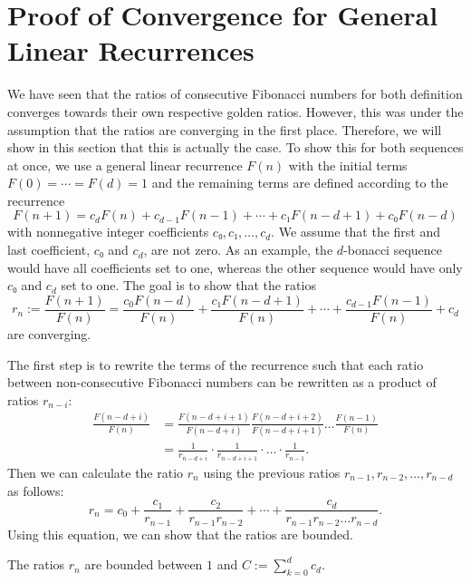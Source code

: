 \section{Proof of Convergence for General Linear Recurrences}
\label{sec:fib-conv}


We have seen that the ratios of consecutive Fibonacci numbers for both
definition converges towards their own respective golden ratios.
However, this was under the assumption that the ratios are converging in the first place.
Therefore, we will show in this section that this is actually the case.
To show this for both sequences at once, we use a general linear recurrence $F(n)$
with the initial terms $F(0) = ⋯ = F(d) = 1$ and the remaining terms are
defined according to the recurrence
\[
  F(n + 1) = c_d F(n) + c_{d-1} F(n-1) + ⋯ + c₁ F(n - d + 1) + c₀ F(n - d)
\]
with nonnegative integer coefficients $c₀, c₁, …, c_d$.
We assume that the first and last coefficient, $c₀$ and $c_d$, are not zero.
As an example, the $d$-bonacci sequence would have all coefficients set to one,
whereas the other sequence would have only $c₀$ and $c_d$ set to one.
The goal is to show that the ratios
\[
  r_n
  := \frac{F(n+1)}{F(n)}
  = \frac{c_0 F(n - d)}{F(n)} + \frac{c₁ F(n - d + 1)}{F(n)} + ⋯ + \frac{c_{d-1} F(n-1)}{F(n)} + c_d
\]
are converging.

The first step is to rewrite the terms of the recurrence such that each ratio
between non-consecutive Fibonacci numbers can be rewritten as a product of
ratios $r_{n-i}$:
\begin{align*}
  \frac{F(n - d + i)}{F(n)}
  & = \frac{F(n - d + i + 1)}{F(n - d + i)} \frac{F(n - d + i + 2)}{F(n - d + i + 1)} \dots \frac{F(n-1)}{F(n)} \\
  & = \frac{1}{r_{n - d + i}} · \frac{1}{r_{n - d + i + 1}} · \dots · \frac{1}{r_{n-1}}.
\end{align*}
Then we can calculate the ratio $r_n$ using the previous ratios $r_{n-1}, r_{n-2}, …, r_{n-d}$ as follows:
\[
  r_n = c_0 + \frac{c_1}{r_{n-1}} + \frac{c_2}{r_{n-1} r_{n-2}} + ⋯ + \frac{c_d}{r_{n-1} r_{n-2} \dots r_{n-d}}.
\]
Using this equation, we can show that the ratios are bounded.

\begin{lemma}
  \label{lem:fib-bounded}
  The ratios $r_n$ are bounded between $1$ and $C := ∑_{k=0}^d c_d$.
\end{lemma}

